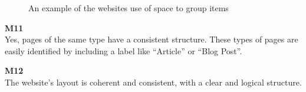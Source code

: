 \begin{description}
\begin{figure}[htp!]
        \caption{An example of the websites use of space to group items}
    \end{figure}
    \item {\textbf{M11} \color{unicefGray}{Consistency of the page structure}}\\
    Yes, pages of the same type have a consistent structure. These types of pages are easily identified by including a label like “Article” or “Blog Post”.
    \item {\textbf{M12} \color{unicefGray}{Coherence in page layout}}\\
    The website's layout is coherent and consistent, with a clear and logical structure.
\end{description}


